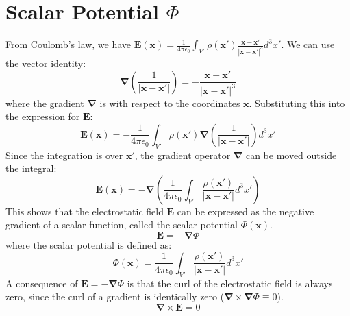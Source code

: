 \documentclass[12pt, a4paper]{article}
\begin{document}
	\section{Scalar Potential $\Phi$}
	From Coulomb's law, we have $\bm{E}(\bm{x}) = \frac{1}{4\pi\epsilon_0} \int_{V'} \rho(\bm{x}') \frac{\bm{x} - \bm{x}'}{|\bm{x} - \bm{x}'|^3} d^3x'$. We can use the vector identity:
	\begin{equation}
		\bm{\nabla} \left( \frac{1}{|\bm{x} - \bm{x}'|} \right) = -\frac{\bm{x} - \bm{x}'}{|\bm{x} - \bm{x}'|^3}
	\end{equation}
	where the gradient $\bm{\nabla}$ is with respect to the coordinates $\bm{x}$. Substituting this into the expression for $\bm{E}$:
	\begin{equation}
		\bm{E}(\bm{x}) = -\frac{1}{4\pi\epsilon_0} \int_{V'} \rho(\bm{x}') \bm{\nabla} \left( \frac{1}{|\bm{x} - \bm{x}'|} \right) d^3x'
	\end{equation}
	Since the integration is over $\bm{x}'$, the gradient operator $\bm{\nabla}$ can be moved outside the integral:
	\begin{equation}
		\bm{E}(\bm{x}) = -\bm{\nabla} \left( \frac{1}{4\pi\epsilon_0} \int_{V'} \frac{\rho(\bm{x}')}{|\bm{x} - \bm{x}'|} d^3x' \right)
	\end{equation}
	This shows that the electrostatic field $\bm{E}$ can be expressed as the negative gradient of a scalar function, called the scalar potential $\Phi(\bm{x})$.
	\begin{equation}
		\bm{E} = -\bm{\nabla}\Phi
	\end{equation}
	where the scalar potential is defined as:
	\begin{equation}
		\Phi(\bm{x}) = \frac{1}{4\pi\epsilon_0} \int_{V'} \frac{\rho(\bm{x}')}{|\bm{x} - \bm{x}'|} d^3x'
	\end{equation}
	A consequence of $\bm{E} = -\bm{\nabla}\Phi$ is that the curl of the electrostatic field is always zero, since the curl of a gradient is identically zero ($\bm{\nabla} \times \bm{\nabla}\Phi \equiv 0$).
	\begin{equation}
		\bm{\nabla} \times \bm{E} = 0
	\end{equation}
	
\end{document}

